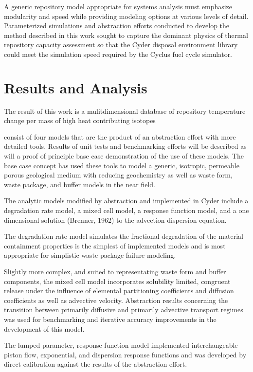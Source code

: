 \documentclass{anstrans}
\begin{document}
A generic repository model appropriate for systems analysis must emphasize 
modularity and speed while providing modeling options at various levels of 
detail. Parameterized simulations and abstraction efforts conducted to develop 
the method described in this work sought to capture the dominant physics of 
thermal repository capacity assessment so that the Cyder disposal environment 
library could meet the simulation speed required by the Cyclus fuel cycle 
simulator.


\section{Results and Analysis}

The result of this work is a mulitdimensional database of repository temperature 
change per mass of high heat contributing isotopes 

consist of four models that are the product of an 
abstraction effort with more detailed tools. Results of unit tests and 
benchmarking efforts will be described as will a proof of principle base case 
demonstration of the use of these models. The base case concept has used these 
tools to model a generic, isotropic, permeable porous geological medium with 
reducing geochemistry as well as waste form, waste package, and buffer models in 
the near field.

The analytic models modified by abstraction and implemented in Cyder include a 
degradation rate model, a mixed cell model, a response function model, and a 
one dimensional solution (Brenner, 1962) to the advection-dispersion equation.

The degradation rate model simulates the fractional degradation of the material 
containment properties is the simplest of implemented models and is most 
appropriate for simplistic waste package failure modeling. 

Slightly more complex, and suited to representating waste form and buffer 
components, the mixed cell model incorporates solubility limited, congruent 
release under the influence of elemental partitioning coefficients and diffusion 
coefficients as well as advective velocity. Abstraction results concerning the 
transition between primarily diffusive and primarily advective transport regimes 
was used for benchmarking and iterative accuracy improvements in the development 
of this model.

The lumped parameter, response function model implemented interchangeable piston flow, 
exponential, and dispersion response functions and was developed by direct 
calibration against the results of the abstraction effort.  
\end{document}

